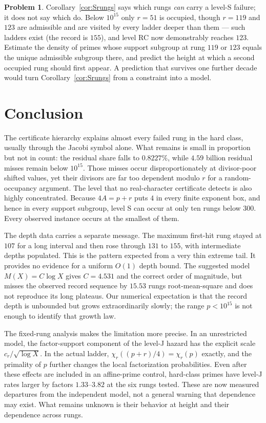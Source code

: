 \documentclass[11pt]{article}
\theoremstyle{definition}
\newtheorem{problem}{Problem}
\theoremstyle{remark}
\begin{document}
\begin{problem}\label{prob:tail}
Corollary~\ref{cor:Srungs} says which rungs \emph{can} carry a level-S failure; it does
not say which do. Below $10^{15}$ only $r = 51$ is occupied, though $r = 119$ and $123$ are
admissible and are visited by every ladder deeper than them --- such ladders exist (the
record is $155$), and level RC now demonstrably reaches $123$. Estimate the density of primes whose support subgroup at rung $119$ or
$123$ equals the unique admissible subgroup there, and predict the height at which a second
occupied rung should first appear. A prediction that survives one further decade would turn
Corollary~\ref{cor:Srungs} from a constraint into a model.
\end{problem}

\fi

\section{Conclusion}\label{sec:conclusion}

The certificate hierarchy explains almost every failed rung in the hard class, usually
through the Jacobi symbol alone. What remains is small in proportion but not in count:
the residual share falls to $0.8227\%$, while $4.59$ billion residual misses remain
below $10^{15}$. Those misses occur disproportionately at divisor-poor shifted values,
yet their divisors are far too dependent modulo $r$ for a random-occupancy argument. The
level that no real-character certificate detects is also highly concentrated. Because
$4A=p+r$ puts $4$ in every finite exponent box, and hence in every support subgroup,
level S can occur at only ten rungs below $300$. Every observed instance occurs at the
smallest of them.

The depth data carries a separate message. The maximum first-hit rung stayed at $107$
for a long interval and then rose through $131$ to $155$, with intermediate depths
populated. This is the pattern expected from a very thin extreme tail. It provides no
evidence for a uniform $O(1)$ depth bound. The suggested model $M(X)=C\log X$ gives
$C=4.531$ and the correct order of magnitude, but misses the observed record sequence
by $15.53$ rungs root-mean-square and does not reproduce its long plateaus. Our
numerical expectation is that the record depth is unbounded but grows extraordinarily
slowly; the range $p<10^{15}$ is not enough to identify that growth law.

The fixed-rung analysis makes the limitation more precise. In an unrestricted model,
the factor-support component of the level-J hazard has the explicit scale
$c_r/\sqrt{\log X}$. In the actual ladder,
$\chi_r((p+r)/4)=\chi_r(p)$ exactly, and the primality of $p$ further changes the local
factorization probabilities. Even after these effects are included in an affine-prime
control, hard-class primes have level-J rates larger by factors $1.33$--$3.82$ at the
six rungs tested. These are now measured departures from the independent model, not a
general warning that dependence may exist. What remains unknown is their behavior at
height and their dependence across rungs.
\end{document}

